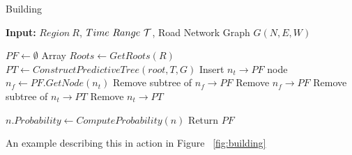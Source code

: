 \begin{algorithm} [ht]
\caption{Building \PF}
\label{alg:building}
\begin{footnotesize}
\textbf{Input:} $Region~R$, $Time~Range~\cal T$, Road Network Graph $G(N,E,W)$
\begin{algorithmic}[1]
\STATE \PF $PF \leftarrow \emptyset$
\STATE {}
\STATE Array $Roots \leftarrow GetRoots(R)$
    \STATE {}
    \STATE \PT $PT \leftarrow ConstructPredictiveTree(root, T, G)$ 
        \STATE {}
            \STATE Insert $n_t \rightarrow PF$
        \ELSE
            \STATE {}
            \STATE node $n_f \leftarrow PF.GetNode(n_t)$
            \STATE {}
                \STATE Remove subtree of $n_f \rightarrow PF$
                \STATE Remove $n_f \rightarrow PF$
            \ELSE
                \STATE Remove subtree of $n_t \rightarrow PT$
                \STATE Remove $n_t \rightarrow PT$
            \ENDIF
        \ENDIF
    \ENDFOR
\ENDFOR

    \STATE $n.Probability \leftarrow ComputeProbability(n)$
\ENDFOR
\STATE Return $PF$
\end{algorithmic}
\end{footnotesize}
\end{algorithm}

An example describing this in action in Figure ~\ref{fig:building}

